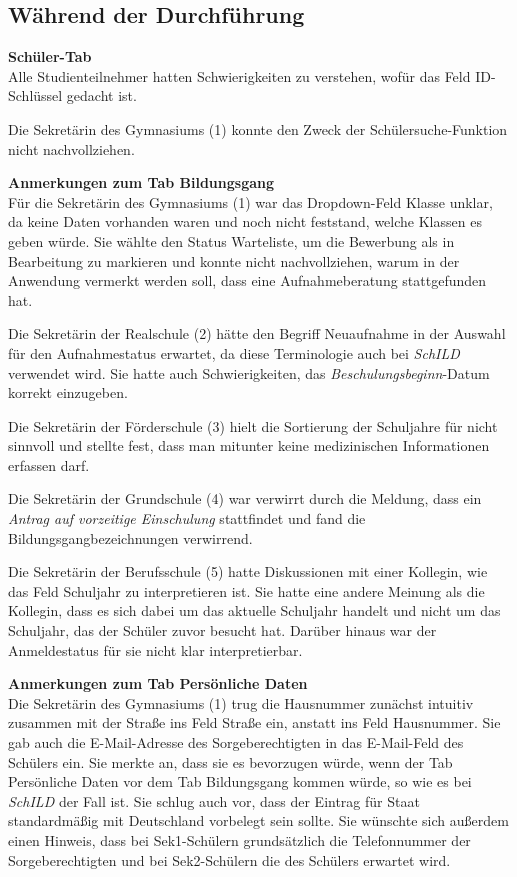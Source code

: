 \subsection{Während der Durchführung}

\textbf{\glqq Schüler\grqq{}-Tab}\\
Alle Studienteilnehmer hatten Schwierigkeiten zu verstehen, wofür das Feld \glqq ID-Schlüssel\grqq{} gedacht ist.

Die Sekretärin des Gymnasiums (1) konnte den Zweck der Schülersuche-Funktion nicht nachvollziehen.


\textbf{Anmerkungen zum Tab \glqq Bildungsgang\grqq{}}\\
Für die Sekretärin des Gymnasiums (1) war das Dropdown-Feld \glqq Klasse\grqq{} unklar, da keine Daten vorhanden waren und noch nicht feststand, welche Klassen es geben würde. Sie wählte den Status \glqq Warteliste\grqq{}, um die Bewerbung als \glqq in Bearbeitung\grqq{} zu markieren und konnte nicht nachvollziehen, warum in der Anwendung vermerkt werden soll, dass eine Aufnahmeberatung stattgefunden hat.

Die Sekretärin der Realschule (2) hätte den Begriff \glqq Neuaufnahme\grqq{} in der Auswahl für den Aufnahmestatus erwartet, da diese Terminologie auch bei \glqq  \textit{SchILD} \grqq{} verwendet wird. Sie hatte auch Schwierigkeiten, das \textit{Beschulungsbeginn}-Datum korrekt einzugeben.

Die Sekretärin der Förderschule (3) hielt die Sortierung der Schuljahre für nicht sinnvoll und stellte fest, dass man mitunter keine medizinischen Informationen erfassen darf.

Die Sekretärin der Grundschule (4) war verwirrt durch die Meldung, dass ein \textit{Antrag auf vorzeitige Einschulung} stattfindet und fand die Bildungsgangbezeichnungen verwirrend.

Die Sekretärin der Berufsschule (5) hatte Diskussionen mit einer Kollegin, wie das Feld \glqq Schuljahr\grqq{} zu interpretieren ist. Sie hatte eine andere Meinung als die Kollegin, dass es sich dabei um das aktuelle Schuljahr handelt und nicht um das Schuljahr, das der Schüler zuvor besucht hat. Darüber hinaus war der Anmeldestatus für sie nicht klar interpretierbar.

\textbf{Anmerkungen zum Tab \glqq Persönliche Daten\grqq{}}\\
Die Sekretärin des Gymnasiums (1) trug die Hausnummer zunächst intuitiv zusammen mit der Straße ins Feld \glqq Straße\grqq{} ein, anstatt ins Feld \glqq Hausnummer\grqq{}. Sie gab auch die E-Mail-Adresse des Sorgeberechtigten in das E-Mail-Feld des Schülers ein. Sie merkte an, dass sie es bevorzugen würde, wenn der Tab \glqq Persönliche Daten\grqq{} vor dem Tab \glqq Bildungsgang\grqq{} kommen würde, so wie es bei \glqq  \textit{SchILD} \grqq{} der Fall ist. Sie schlug auch vor, dass der Eintrag für \glqq Staat\grqq{} standardmäßig mit \glqq Deutschland\grqq{} vorbelegt sein sollte. Sie wünschte sich außerdem einen Hinweis, dass bei Sek1-Schülern grundsätzlich die Telefonnummer der Sorgeberechtigten und bei Sek2-Schülern die des Schülers erwartet wird.

